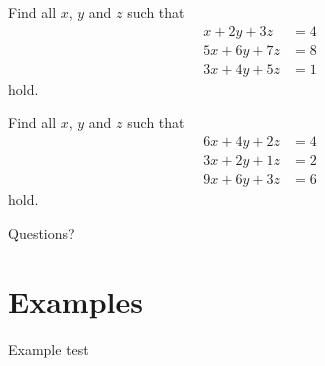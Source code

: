 \documentclass{beamer}
\begin{document}
\begin{frame}
  Find all $x$, $y$ and $z$ such that
  \begin{align*}
    x+2y+3z&=4\\
    5x+6y+7z&=8\\
    3x+4y+5z&=1
  \end{align*}
  hold.
\end{frame}

\begin{frame}
  Find all $x$, $y$ and $z$ such that
  \begin{align*}
    6x+4y+2z&=4\\
    3x+2y+1z&=2\\
    9x+6y+3z&=6
  \end{align*}
  hold.
\end{frame}

\begin{frame}
  Questions?
\end{frame}

\section{Examples}
\label{sec:Examples-2}

\begin{frame}{Example}
  test
\end{frame}
\end{document}
